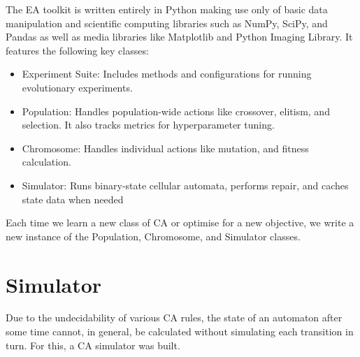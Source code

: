 The EA toolkit is written entirely in Python making use only of basic data manipulation and scientific computing libraries such as NumPy, SciPy, and Pandas as well as media libraries like Matplotlib and Python Imaging Library. It features the following key classes:
\begin{itemize}
    \item Experiment Suite: Includes methods and configurations for running evolutionary experiments.
    \item Population: Handles population-wide actions like crossover, elitism, and selection. It also tracks metrics for hyperparameter tuning.
    \item Chromosome: Handles individual actions like mutation, and fitness calculation.
    \item Simulator: Runs binary-state cellular automata, performs repair, and caches state data when needed
\end{itemize}
Each time we learn a new class of CA or optimise for a new objective, we write a new instance of the Population,  Chromosome, and Simulator classes.

\section{Simulator} \label{subsec:simulator}
Due to the undecidability of various CA rules, the state of an automaton after some time cannot, in general, be calculated without simulating each transition in turn. For this, a CA simulator was built.\\

